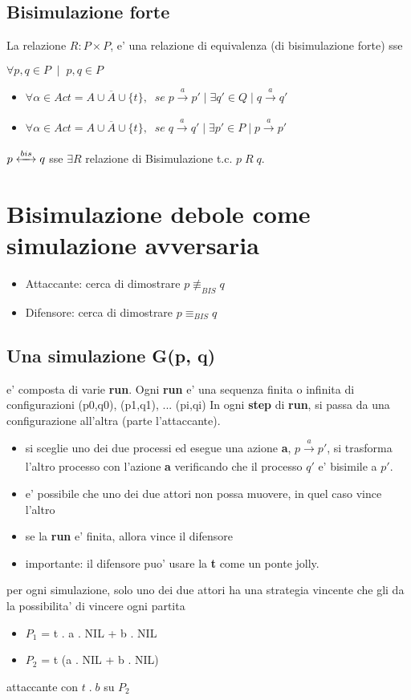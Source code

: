 \subsection{Bisimulazione forte}

La relazione $R : P \times P$,  e' una relazione di equivalenza (di bisimulazione forte) sse

$\forall p,q \in P \;\; | \;\; p,q \in P$ 

\begin{itemize}
  \item $\forall \alpha \in Act = A \cup \overline A \cup \{t\}, \;\; se \; p \xrightarrow[]{a} p' \; | \; \exists q' \in Q \; | \; q \xrightarrow[]{a} q'$
  \item $\forall \alpha \in Act = A \cup \overline A \cup \{t\}, \;\; se \; q \xrightarrow[]{a} q' \; | \; \exists p' \in P \; | \; p \xrightarrow[]{a} p'$
\end{itemize}

$p \xleftrightarrow[]{bis} q$ sse $\exists R$ relazione di Bisimulazione t.c. $p \; R \; q$.

\section{Bisimulazione debole come simulazione avversaria}

\begin{itemize}
  \item Attaccante: cerca di dimostrare $p \not \equiv_{BIS} q$
  \item Difensore: cerca di dimostrare $p \equiv_{BIS} q$
\end{itemize}

\subsection{Una simulazione G(p, q)}

e' composta di varie \textbf{run}. Ogni \textbf{run} e' una sequenza finita o infinita di configurazioni (p0,q0), (p1,q1), ... (pi,qi)
In ogni \textbf{step} di \textbf{run}, si passa da una configurazione all'altra (parte l'attaccante).

\begin{itemize}
  \item si sceglie uno dei due processi ed esegue una azione \textbf{a}, $p \xrightarrow[]{a} p'$, si trasforma l'altro processo con l'azione \textbf{a} verificando che il processo $q'$ e' bisimile a $p'$.
  \item e' possibile che uno dei due attori non possa muovere, in quel caso vince l'altro
  \item se la \textbf{run} e' finita, allora vince il difensore
  \item importante: il difensore puo' usare la \textbf{t} come un ponte jolly.
\end{itemize}

per ogni simulazione, solo uno dei due attori ha una strategia vincente che gli da la possibilita' di vincere ogni partita

\begin{itemize}
  \item $P_1$ = t . a . NIL + b . NIL
  \item $P_2$ = t (a . NIL + b . NIL)
\end{itemize}

attaccante con $ t \; . \; b$ su $P_2$

